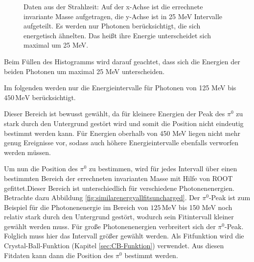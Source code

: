 \documentclass[a4paper,11pt,oneside,final,german,openbib,pdftex]{scrbook}
\begin{document}
{\begin{figure}[h!]
\begin{center}
		\caption[Strahlzeit: 2D-Histogramm; Keine weiteren Bedingungen]{Daten aus der Strahlzeit: Auf der x-Achse ist die errechnete invariante Masse aufgetragen, die y-Achse ist in 25 MeV Intervalle aufgeteilt. Es werden nur Photonen ber\"ucksichtigt, die sich energetisch \"ahnelten. Das hei{\ss}t ihre Energie unterscheidet sich maximal um 25 MeV.}
			\label{fig:Energy-Interval-Hist-All-Bins}
	\end{center}
\end{figure}

Beim Füllen des Histogramms wird darauf geachtet, dass sich die Energien der beiden Photonen um maximal 25 MeV unterscheiden.

Im folgenden werden nur die Energieintervalle f\"ur Photonen von 125 MeV bis $450\, \text{MeV}$ ber\"ucksichtigt.

Dieser Bereich ist bewusst gew\"ahlt, da f\"ur kleinere Energien der Peak des $\pi^0$ zu stark durch den Untergrund gest\"ort wird und somit die Position nicht eindeutig bestimmt werden kann. F\"ur Energien oberhalb von 450 MeV liegen nicht mehr genug Ereignisse vor, sodass auch h\"ohere Energieintervalle ebenfalls verworfen werden m\"ussen. 


Um nun die Position des $\pi^0$ zu bestimmen, wird für jedes Intervall über einen bestimmten Bereich der errechneten invarianten Masse mit Hilfe von ROOT gefittet.Dieser Bereich ist unterschiedlich f\"ur verschiedene Photonenenergien. Betrachte dazu Abbildung \ref{fig:similarenergyallfitsuncharged}. Der $\pi^0$-Peak ist zum Beispiel f\"ur die Photonenenergie im Bereich von $125\, \text{MeV}$ bis 150 MeV noch relativ stark durch den Untergrund gest\"ort, wodurch sein Fitintervall kleiner gew\"ahlt werden muss. F\"ur gro{\ss}e Photonenenergien verbreitert sich der $\pi^0$-Peak. Folglich muss hier das Intervall gr\"o{\ss}er gew\"ahlt werden. Als Fitfunktion wird die Crystal-Ball-Funktion (Kapitel \ref{sec:CB-Funktion}) verwendet. 
Aus diesen Fitdaten kann dann die Position des $\pi^0$ bestimmt werden.



  
 
}
\end{document}

